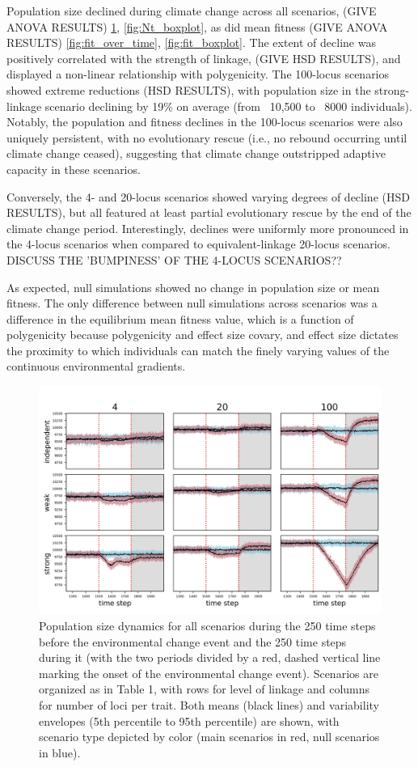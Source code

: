 \documentclass[9pt,twocolumn,twoside,lineno]{pnas-new}
\begin{document}
Population size declined during climate change across all scenarios, (GIVE ANOVA 
RESULTS) \ref{fig:Nt_over_time}, \ref{fig:Nt_boxplot}, as did mean fitness (GIVE ANOVA 
RESULTS) \ref{fig:fit_over_time}, \ref{fig:fit_boxplot}. The extent of decline was 
positively correlated with the strength of linkage, (GIVE HSD RESULTS), and 
displayed a non-linear relationship with polygenicity. The 100-locus scenarios showed 
extreme reductions (HSD RESULTS), with population size in the strong-linkage scenario
declining by 19\% on average (from ~10,500 to ~8000 individuals).
Notably, the population and fitness declines in the 100-locus scenarios
were also uniquely persistent, with no evolutionary rescue (i.e., no rebound occurring until climate change ceased), 
suggesting that climate change outstripped adaptive capacity in these scenarios.

Conversely, the 4- and 20-locus scenarios showed varying degrees
of decline (HSD RESULTS),
but all featured at least partial evolutionary rescue by the end of the climate change period.
Interestingly, declines were uniformly more pronounced in the 4-locus scenarios
when compared to equivalent-linkage 20-locus scenarios. DISCUSS THE 'BUMPINESS' OF THE 4-LOCUS SCENARIOS?? 
 
As expected, null simulations showed no change in population size or mean fitness. The only difference between null simulations across scenarios was a difference in the 
equilibrium mean fitness value, which is a function of polygenicity because polygenicity 
and effect size covary, and effect size dictates the proximity to which individuals can 
match the finely varying values of the continuous environmental gradients.

\begin{figure}
\centering
\includegraphics[width=11.4cm]{Nt_over_time.jpg}
\caption{Population size dynamics for all scenarios during the 250 time steps before the environmental change event and the 250 time steps during it (with the two periods divided by a red, dashed vertical line marking the onset of the environmental change event). Scenarios are organized as in Table 1, with rows for level of linkage and columns for number of loci per trait. Both means (black lines) and variability envelopes (5th percentile to 95th percentile) are shown, with scenario type depicted by color (main scenarios in red, null scenarios in blue).}
\label{fig:Nt_over_time}
\end{figure}
\end{document}
